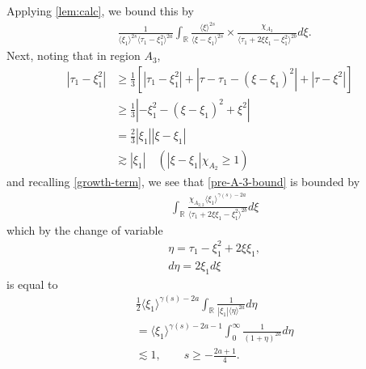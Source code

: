\documentclass[12pt,reqno]{amsart}
\numberwithin{equation}{section}  %
\numberwithin{figure}{section}
\newcommand{\rr}{\mathbb{R}}
\theoremstyle{plain}
\theoremstyle{definition}
\theoremstyle{remark}
\begin{document}
Applying \autoref{lem:calc}, we bound this by
%
%
\begin{equation}
  \label{pre-A-3-bound}
\begin{split}
  &  \frac{1}{\langle \xi_{1} \rangle ^{2s}
  \langle \tau_{1} - \xi_{1}^{2}  \rangle
  ^{2a}} \int_{\rr} \frac{\langle \xi \rangle ^{2s}}{\langle
  \xi - \xi_{1}\rangle ^{2s}}  \times \frac{\chi_{A_{3}}}{\langle
  \tau_{1} + 2 \xi \xi_{1} - \xi_{1}^{2} \rangle ^{2b}} d \xi.
\end{split}
\end{equation}
%
Next, noting that in region $A_{3}$,
%
%
\begin{equation*}
\begin{split}
  | \tau_{1} -\xi_{1}^{2} |
  & \ge \frac{1}{3} \left[ | \tau_{1} - \xi_{1}^{2} | + | \tau - \tau_{1} -
  (\xi - \xi_{1})^{2} | + | \tau - \xi^{2} | \right]
  \\
  & \ge \frac{1}{3} | - \xi_{1}^{2} - (\xi - \xi_{1})^{2} + \xi^{2} |
  \\
  & = \frac{2}{3} | \xi_{1} | | \xi - \xi_{1} |
  \\
  & \gtrsim | \xi_{1} | \quad (| \xi - \xi_{1} |\chi_{A_{2}} \ge 1)
\end{split}
\end{equation*}
%
%
and recalling \eqref{growth-term}, we see that \eqref{pre-A-3-bound} is bounded by
\begin{equation*}
\begin{split}
  &  \int_{\rr} \frac{\chi_{A_{2,2}} \langle \xi_{1} \rangle ^{\gamma(s) -2a}}{\langle
  \tau_{1} + 2 \xi \xi_{1} - \xi_{1}^{2} \rangle ^{2b}} d \xi
\end{split}
\end{equation*}
%
which by the change of variable
%
%
\begin{equation*}
\begin{split}
  & \eta = \tau_{1} - \xi_{1}^{2} + 2 \xi \xi_{1},
  \\
  & d \eta = 2 \xi_{1} d \xi
\end{split}
\end{equation*}
%
%
is equal to
%
%
\begin{equation*}
\begin{split}
  & \frac{1}{2} \langle \xi_{1} \rangle ^{\gamma(s)-2a}  \int_{\rr} 
  \frac{1}{| \xi_{1} |\langle \eta \rangle ^{2a} }d \eta
  \\
  & = \langle \xi_{1} \rangle ^{\gamma(s)-2a-1} \int_{0}^{\infty} \frac{1}{(1 + \eta
  )^{2a}}d \eta
  \\
  & \lesssim 1, \qquad s \ge -\frac{2a+1}{4}.
\end{split}
\end{equation*}
%
%
\end{document}
